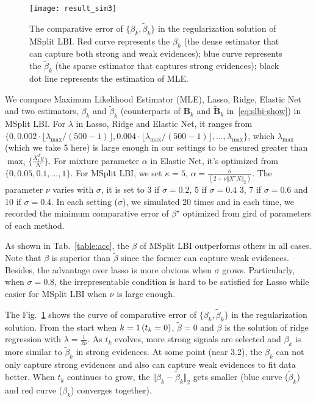 \documentclass{article}
\begin{document}
\begin{figure}[h!]
\centering{}\centering{}\texttt{[image: result\_sim3]}
\caption{The comparative error of $\{\beta_{k},\tilde{\beta}_{k}\}$ in the regularization
solution of MSplit LBI. Red curve represents the $\beta_{k}$ (the
dense estimator that can capture both strong and weak evidences);
blue curve represents the $\tilde{\beta}_{k}$ (the sparse estimator
that captures strong evidences); black dot line represents the estimation
of MLE.}{\small{}{\small{}\vspace{-0.1in}}}\label{figure:simulation-1}
\end{figure}


We compare Maximum Likelihood Estimator (MLE), Lasso, Ridge, Elastic
Net and two estimators, $\beta_{k}$ and $\tilde{\beta}_{k}$ (counterparts
of $\mathbf{B}_{k}$ and $\widetilde{\mathbf{B}}_{k}$ in~\ref{eq:slbi-show})
in MSplit LBI. For $\lambda$ in Lasso, Ridge and Elastic Net, it
ranges from $\{0,0.002\cdot\lfloor\lambda_{\max}/(500-1)\rfloor,0.004\cdot\lfloor\lambda_{\max}/(500-1)\rfloor,...,\lambda_{\max}\}$,
which $\lambda_{\max}$ (which we take 5 here) is large enough in
our settings to be ensured greater than $\max_{i}\{\frac{X_{i}^{T}y}{N}\}$.
For mixture parameter $\alpha$ in Elastic Net, it's optimized from
$\{0,0.05,0.1,...,1\}$. For MSplit LBI, we set $\kappa=5$, $\alpha=\frac{\kappa}{(2+\nu\Vert X^{\star}X\Vert_{2})}$.
The parameter $\nu$ varies with $\sigma$, it is set to 3 if $\sigma=0.2$,
5 if $\sigma=0.4$ 3, 7 if $\sigma=0.6$ and 10 if $\sigma=0.4$.
In each setting ($\sigma$), we simulated 20 times and in each time,
we recorded the minimum comparative error of $\beta^{\star}$ optimized
from gird of parameters of each method.


As shown in Tab.~\ref{table:acc}, the $\beta$ of MSplit LBI outperforms
others in all cases. Note that $\beta$ is superior than $\tilde{\beta}$
since the former can capture weak evidences. {Besides, the advantage over lasso is more obvious when $\sigma$ grows}. Particularly,
when $\sigma=0.8$, the irrepresentable condition is hard to be satisfied
for Lasso while easier for MSplit LBI when $\nu$ is large enough.




The Fig.~\ref{figure:simulation-1} shows the curve of comparative
error of $\{\beta_{k},\tilde{\beta}_{k}\}$ in the regularization
solution. From the start when $k=1\thinspace(t_{k}=0)$, $\tilde{\beta}=0$
and $\beta$ is the solution of ridge regression with $\lambda=\frac{1}{2\nu}$.
As $t_{k}$ evolves, more strong signals are selected and $\beta_{k}$
is more similar to $\tilde{\beta}_{k}$ in strong evidences. At some
point (near 3.2), the $\beta_{k}$ can not only capture strong evidences
and also can capture weak evidences to fit data better. When $t_{k}$
continues to grow, the $\Vert\beta_{k}-\tilde{\beta}_{k}\Vert_{2}$
gets smaller (blue curve ($\tilde{\beta}_{k}$) and red curve ($\beta_{k}$)
converges together).
\end{document}
